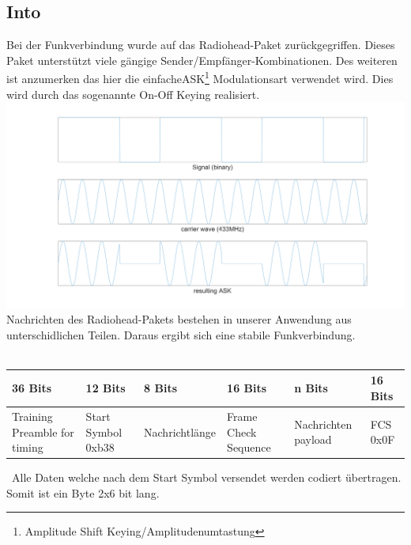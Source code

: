\subsection{Into}
Bei der Funkverbindung wurde auf das Radiohead-Paket\cite{rh} zurückgegriffen. Dieses Paket unterstützt viele gängige Sender/Empfänger-Kombinationen. Des weiteren ist anzumerken das hier die \grqq einfache\grqq  ASK\footnote{Amplitude Shift Keying/Amplitudenumtastung} Modulationsart verwendet wird. Dies wird durch das sogenannte On-Off Keying realisiert. \newline\includegraphics[width=\textwidth]{Hauptteil/sw/intro/ask.png}
Nachrichten des Radiohead-Pakets bestehen in unserer Anwendung aus unterschidlichen Teilen. Daraus ergibt sich eine stabile Funkverbindung.\\\
\begin{tabularx}{\textwidth}{|X|X|l|X|X|X|}
\hline
 36 Bits & 12 Bits & 8 Bits & 16 Bits & n Bits & 16 Bits\\
\hline
Training Preamble for timing & Start Symbol 0xb38 & Nachrichtlänge & Frame Check Sequence & Nachrichten payload & FCS 0x0F\\
\hline
\end{tabularx}\
Alle Daten welche nach dem Start Symbol versendet werden codiert übertragen. Somit ist ein Byte 2x6 bit lang.
